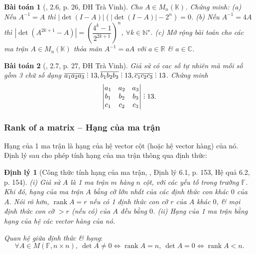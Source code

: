 \documentclass{article}
\newtheorem{baitoan}{Bài toán}
\newtheorem{dinhly}{Định lý}
\DeclareRobustCommand{\divby}{%
	\mathrel{\vbox{\baselineskip.65ex\lineskiplimit0pt\hbox{.}\hbox{.}\hbox{.}}}%
}
\begin{document}
\begin{baitoan}[\cite{VMS_VMC2024}, 2.6, p. 26, ĐH Trà Vinh]
	Cho $A\in M_n(\mathbb{K})$. Chứng minh: (a) Nếu $A^{-1} = A$ thì $|\det(I - A)|(|\det(I - A)| - 2^n) = 0$. (b) Nếu $A^{-1} = 4A$ thì $|\det(A^{2k+1} - A)| = \left(\dfrac{4^k - 1}{2^{2k + 1}}\right)^n$, $\forall k\in\mathbb{N}^\star$. (c) Mở rộng bài toán cho các ma trận $A\in M_n(\mathbb{K})$ thỏa mãn $A^{-1} = aA$ với $a\in\mathbb{R}$ \& $a\in\mathbb{C}$.
\end{baitoan}

\begin{baitoan}[\cite{VMS_VMC2024}, 2.7, p. 27, ĐH Trà Vinh]
	Giả sử có cac số tự nhiên mà mỗi số gồm 3 chữ số dạng $\overline{a_1a_2a_3}\divby13,\overline{b_1b_2b_3}\divby13,\overline{c_1c_2c_3}\divby13$. Chứng minh
	\begin{equation*}
		\begin{vmatrix}
			a_1 & a_2 & a_3\\b_1 & b_2 & b_3\\c_1 & c_2 & c_3
		\end{vmatrix}\divby13.
	\end{equation*}
\end{baitoan}


\subsubsection{Rank of a matrix -- Hạng của ma trận}
Hạng của 1 ma trận là hạng của hệ vector cột (hoặc hệ vector hàng) của nó. Định lý sau cho phép tính hạng của ma trận thông qua định thức:

\begin{dinhly}[Công thức tính hạng của ma trận, \cite{Hung_linear_algebra}, Định lý 6.1, p. 153, Hệ quả 6.2, p. 154]
	(i) Giả sử $A$ là 1 ma trận $m$ hàng $n$ cột, với các yếu tố trong trường $\mathbb{F}$. Khi đó, hạng của ma trận $A$ bằng cỡ lớn nhất của các định thức con khác $0$ của $A$. Nói rõ hơn, $\operatorname{rank}A = r$ nếu có 1 định thức con cỡ $r$ của $A$ khác $0$, \& mọi định thức con cỡ $> r$ (nếu có) của $A$ đều bằng $0$. (ii) Hạng của 1 ma trận bằng hạng của hệ các vector hàng của nó.
\end{dinhly}
{\it Quan hệ giữa định thức \& hạng}:
\begin{equation*}
	\forall A\in M(\mathbb{F},n\times n),\ \det A\ne0\Leftrightarrow\operatorname{rank}A = n,\ \det A = 0\Leftrightarrow\operatorname{rank}A < n.
\end{equation*}
\end{document}
